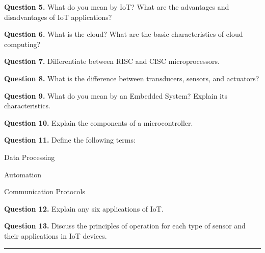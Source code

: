 \documentclass[11pt,a4paper]{article}
\begin{document}
\medskip



\noindent   \textbf{Question 5.} What do you mean by IoT? What are the advantages and disadvantages of IoT applications?

\medskip



\noindent   \textbf{Question 6.} What is the cloud? What are the basic characteristics of cloud computing?

\medskip



\noindent   \textbf{Question 7.} Differentiate between RISC and CISC microprocessors.

\medskip



\noindent   \textbf{Question 8.} What is the difference between transducers, sensors, and actuators?

\medskip



\noindent   \textbf{Question 9.} What do you mean by an Embedded System? Explain its characteristics.

\medskip



\noindent   \textbf{Question 10.} Explain the components of a microcontroller.

\medskip



\noindent   \textbf{Question 11.} Define the following terms:

\begin{parts}
  \item Data Processing
  \item Automation
  \item Communication Protocols
\end{parts}

\medskip



\noindent   \textbf{Question 12.} Explain any six applications of IoT.

\medskip



\noindent   \textbf{Question 13.} Discuss the principles of operation for each type of sensor and their applications in IoT devices.

\bigskip


\rule{\linewidth}{0.4pt}\smallskip
\end{document}
